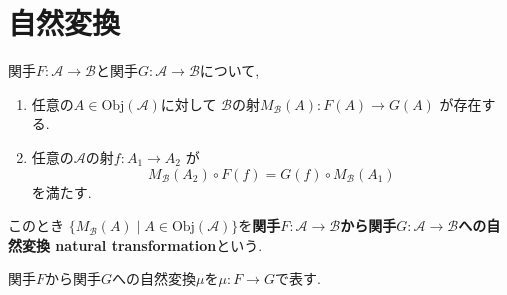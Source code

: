 \section{自然変換}
\begin{Def}
関手$F:\mathscr{A}\rightarrow\mathscr{B}$と関手$G:\mathscr{A}\rightarrow\mathscr{B}$について,
\begin{enumerate}
\item 任意の$A\in\mathrm{Obj}(\mathscr{A})$に対して
$\mathscr{B}$の射$M_{\mathscr{B}}(A):F(A)\rightarrow G(A)$
が存在する.
\item 任意の$\mathscr{A}$の射$f:A_1\rightarrow A_2$
が
\[
M_{\mathscr{B}}(A_2)\circ F(f)
=G(f)\circ M_{\mathscr{B}}(A_1)
\]
を満たす.
\end{enumerate}
このとき
$\{M_{\mathscr{B}}(A)\mid A\in\mathrm{Obj}(\mathscr{A})\}$を{\bf 関手$F:\mathscr{A}\rightarrow\mathscr{B}$から関手$G:\mathscr{A}\rightarrow\mathscr{B}$への自然変換 natural transformation}という.
\end{Def}
\begin{Notation}
関手$F$から関手$G$への自然変換$\mu$を$\mu:F\rightarrow G$で表す.
\end{Notation}
\begin{comment}
\begin{Notation}
関手$F$から関手$G$への自然変換$\alpha$を次の図表で表す.
\end{Notation}
\end{comment}
\begin{comment}
\section{Haskにおける自然変換}
\subsection{concat}
\subsection{List関手からMaybe関手への自然変換safehead}
\subsection{concatとsafeheadの垂直合成}
\subsection{二分木からリストへのflatten関数}

\section{Haskにおける定数関手}
\subsection{length関数}
\end{comment}


